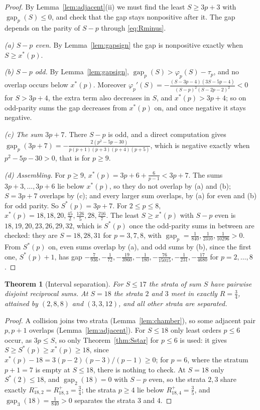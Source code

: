 \documentclass[pdflatex,sn-mathphys-num]{sn-jnl}
\theoremstyle{thmstyleone}%
\newtheorem{theorem}{Theorem}[section]%
\theoremstyle{thmstylethree}%
\newcommand{\gap}{\operatorname{gap}}
\begin{document}
\begin{proof}
By Lemma~\ref{lem:adjacent}(ii) we must find the least $S\ge3p+3$ with $\gap_p(S)\le0$, and check that the gap stays nonpositive after it. The gap depends on the parity of $S-p$ through \eqref{eq:Rminus}.

\emph{(a) $S-p$ even.} By Lemma~\ref{lem:gapsign} the gap is nonpositive exactly when $S\ge x^*(p)$.

\emph{(b) $S-p$ odd.} By Lemma~\ref{lem:gapsign}, $\gap_p(S)>\varphi_p(S)-\tau_p$, and no overlap occurs below $x^*(p)$. Moreover $\varphi_p'(S)=-\frac{(S-3p-4)(3S-5p-4)}{(S-p)^2(S-2p-2)^2}<0$ for $S>3p+4$, the extra term also decreases in $S$, and $x^*(p)>3p+4$; so on odd-parity sums the gap decreases from $x^*(p)$ on, and once negative it stays negative.

\emph{(c) The sum $3p+7$.} There $S-p$ is odd, and a direct computation gives $\gap_p(3p+7)=-\frac{2(p^2-5p-30)}{p(p+1)(p+3)(p+4)(p+5)}$, which is negative exactly when $p^2-5p-30>0$, that is for $p\ge9$.

\emph{(d) Assembling.} For $p\ge9$, $x^*(p)=3p+6+\frac6{p-1}<3p+7$. The sums $3p+3,\dots,3p+6$ lie below $x^*(p)$, so they do not overlap by (a) and (b); $S=3p+7$ overlaps by (c); and every larger sum overlaps, by (a) for even and (b) for odd parity. So $S^*(p)=3p+7$. For $2\le p\le8$, $x^*(p)=18,18,20,\frac{45}2,\frac{126}5,28,\frac{216}7$. The least $S\ge x^*(p)$ with $S-p$ even is $18,19,20,23,26,29,32$, which is $S^*(p)$ once the odd-parity sums in between are checked: they are $S=18,28,31$ for $p=3,7,8$, with $\gap_p=\frac1{840},\frac1{2310},\frac1{10296}>0$. From $S^*(p)$ on, even sums overlap by (a), and odd sums by (b), since the first one, $S^*(p)+1$, has gap $-\frac7{936},-\frac1{72},-\frac{19}{3960},-\frac1{180},-\frac{76}{15015},-\frac1{231},-\frac{17}{4680}$ for $p=2,\dots,8$.
\end{proof}

\begin{theorem}[Interval separation]\label{thm:separation}
For $S\le17$ the strata of sum $S$ have pairwise disjoint reciprocal sums. At $S=18$ the strata $2$ and $3$ meet in exactly $R=\frac34$, attained by $(2,8,8)$ and $(3,3,12)$, and all other strata are separated.
\end{theorem}

\begin{proof}
A collision joins two strata (Lemma~\ref{lem:chamber}), so some adjacent pair $p,p+1$ overlaps (Lemma~\ref{lem:adjacent}). For $S\le18$ only least orders $p\le6$ occur, as $3p\le S$, so only Theorem~\ref{thm:Sstar} for $p\le6$ is used: it gives $S\ge S^*(p)\ge x^*(p)\ge18$, since $x^*(p)-18=3(p-2)(p-3)/(p-1)\ge0$; for $p=6$, where the stratum $p+1=7$ is empty at $S\le18$, there is nothing to check. At $S=18$ only $S^*(2)\le18$, and $\gap_2(18)=0$ with $S-p$ even, so the strata $2,3$ share exactly $R^-_{18,2}=R^+_{18,3}=\frac34$; the strata $p\ge4$ lie below $R^+_{18,4}=\frac35$, and $\gap_3(18)=\frac1{840}>0$ separates the strata $3$ and $4$.
\end{proof}
\end{document}
